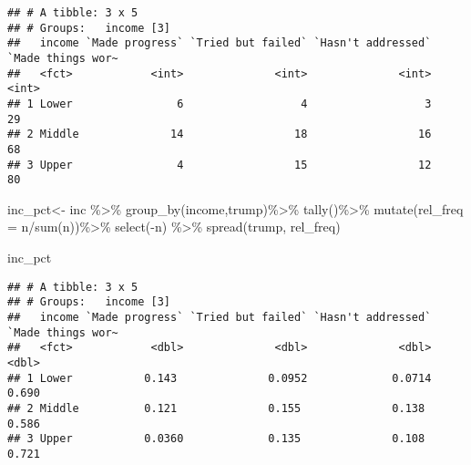 \documentclass[
]{article}
\newenvironment{Shaded}{\begin{snugshade}}{\end{snugshade}}
\newcommand{\AttributeTok}[1]{\textcolor[rgb]{0.77,0.63,0.00}{#1}}
\newcommand{\FunctionTok}[1]{\textcolor[rgb]{0.00,0.00,0.00}{#1}}
\newcommand{\NormalTok}[1]{#1}
\newcommand{\OtherTok}[1]{\textcolor[rgb]{0.56,0.35,0.01}{#1}}
\newcommand{\SpecialCharTok}[1]{\textcolor[rgb]{0.00,0.00,0.00}{#1}}
\begin{document}
\begin{verbatim}
## # A tibble: 3 x 5
## # Groups:   income [3]
##   income `Made progress` `Tried but failed` `Hasn't addressed` `Made things wor~
##   <fct>            <int>              <int>              <int>             <int>
## 1 Lower                6                  4                  3                29
## 2 Middle              14                 18                 16                68
## 3 Upper                4                 15                 12                80
\end{verbatim}

\begin{Shaded}
\begin{Highlighting}[]
\NormalTok{inc\_pct}\OtherTok{\textless{}{-}}\NormalTok{ inc }\SpecialCharTok{\%\textgreater{}\%}
  \FunctionTok{group\_by}\NormalTok{(income,trump)}\SpecialCharTok{\%\textgreater{}\%}
  \FunctionTok{tally}\NormalTok{()}\SpecialCharTok{\%\textgreater{}\%}
  \FunctionTok{mutate}\NormalTok{(}\AttributeTok{rel\_freq =}\NormalTok{ n}\SpecialCharTok{/}\FunctionTok{sum}\NormalTok{(n))}\SpecialCharTok{\%\textgreater{}\%}
  \FunctionTok{select}\NormalTok{(}\SpecialCharTok{{-}}\NormalTok{n) }\SpecialCharTok{\%\textgreater{}\%}
  \FunctionTok{spread}\NormalTok{(trump, rel\_freq) }

\NormalTok{inc\_pct}
\end{Highlighting}
\end{Shaded}

\begin{verbatim}
## # A tibble: 3 x 5
## # Groups:   income [3]
##   income `Made progress` `Tried but failed` `Hasn't addressed` `Made things wor~
##   <fct>            <dbl>              <dbl>              <dbl>             <dbl>
## 1 Lower           0.143              0.0952             0.0714             0.690
## 2 Middle          0.121              0.155              0.138              0.586
## 3 Upper           0.0360             0.135              0.108              0.721
\end{verbatim}
\end{document}
